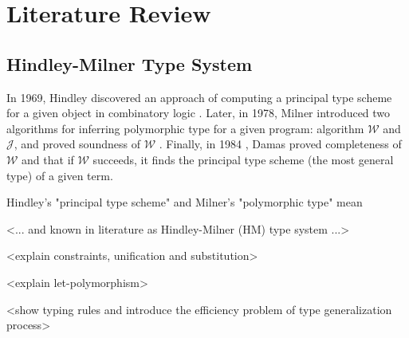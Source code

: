 \chapter{Literature Review}
\label{chap:lr}




\section{Hindley-Milner Type System}

In 1969, Hindley discovered an approach of computing a principal type scheme for a given object in combinatory logic \cite{Hindley1969_PrincipalTypeScheme}. Later, in 1978, Milner introduced two algorithms for inferring polymorphic type for a given program: algorithm $\mathcal{W}$ and $\mathcal{J}$, and proved soundness of $\mathcal{W}$ \cite{Milner1978_TypePolymorphism}. Finally, in 1984 \cite{Damas1984_TypeAssignment}, Damas proved completeness of $\mathcal{W}$ and that if $\mathcal{W}$ succeeds, it finds the principal type scheme (the most general type) of a given term.

Hindley's "principal type scheme" and Milner's "polymorphic type" mean 

<... and known in literature as Hindley-Milner (HM) type system ...>

<explain constraints, unification and substitution>

<explain let-polymorphism>

<show typing rules and introduce the efficiency problem of type generalization process>


